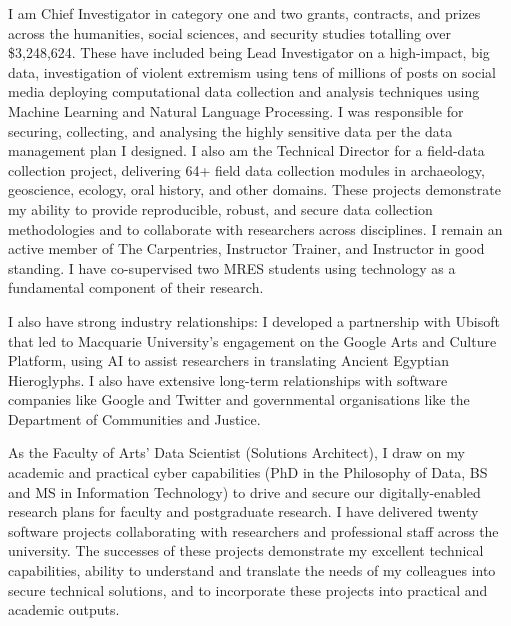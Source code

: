 \documentclass[11pt, a4paper]{awesome-cv}
\begin{document}
\begin{cvletter}

I am Chief Investigator in category one and two grants, contracts, and prizes across the humanities, social sciences, and security studies totalling over \$3,248,624. These have included being Lead Investigator on a high-impact, big data, investigation of violent extremism using tens of millions of posts on social media deploying computational data collection and analysis techniques using Machine Learning and Natural Language Processing. I was responsible for securing, collecting, and analysing the highly sensitive data per the data management plan I designed. I also am the Technical Director for a field-data collection project, delivering 64+ field data collection modules in archaeology, geoscience, ecology, oral history, and other domains. These projects demonstrate my ability to provide reproducible, robust, and secure data collection methodologies and to collaborate with researchers across disciplines. I remain an active member of The Carpentries, Instructor Trainer, and Instructor in good standing. I have co-supervised two MRES students using technology as a fundamental component of their research. 

I also have strong industry relationships: I developed a partnership with Ubisoft that led to Macquarie University's engagement on the Google Arts and Culture Platform, using AI to assist researchers in translating Ancient Egyptian Hieroglyphs. I also have extensive long-term relationships with software companies like Google and Twitter and governmental organisations like the Department of Communities and Justice. 

As the Faculty of Arts' Data Scientist (Solutions Architect), I draw on my academic and practical cyber capabilities (PhD in the Philosophy of Data, BS and MS in Information Technology) to drive and secure our digitally-enabled research plans for faculty and postgraduate research. I have delivered twenty software projects collaborating with researchers and professional staff across the university. The successes of these projects demonstrate my excellent technical capabilities, ability to understand and translate the needs of my colleagues into secure technical solutions, and to incorporate these projects into practical and academic outputs.



\end{cvletter}
\end{document}
